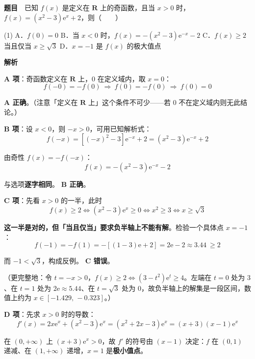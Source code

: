 \par\medskip


\textbf{题目}　已知 $f(x)$ 是定义在 $\mathbf{R}$ 上的奇函数，且当 $x>0$ 时，$f(x)=\left(x^2-3\right)\mathrm{e}^{x}+2$，则（　　）

\begin{gkopts}(1)
\task A．$f(0)=0$
\task B．当 $x<0$ 时，$f(x)=-\left(x^2-3\right)\mathrm{e}^{-x}-2$
\task C．$f(x)\ge 2$ 当且仅当 $x\ge\sqrt3$
\task D．$x=-1$ 是 $f(x)$ 的极大值点
\end{gkopts}

\textbf{解析}

\par\medskip

\textbf{A 项}：奇函数定义在 $\mathbf R$ 上，$0$ 在定义域内，取 $x=0$：
\[f(-0)=-f(0)\ \Longrightarrow\ f(0)=-f(0)\ \Longrightarrow\ f(0)=0\]

 \textbf{A 正确}。（注意「定义在 $\mathbf R$ 上」这个条件不可少——若 $0$ 不在定义域内则无此结论。）

\textbf{B 项}：设 $x<0$，则 $-x>0$，可用已知解析式：
\[f(-x)=\left[(-x)^2-3\right]\mathrm{e}^{-x}+2=\left(x^2-3\right)\mathrm{e}^{-x}+2\]

由奇性 $f(x)=-f(-x)$：
\[f(x)=-\left(x^2-3\right)\mathrm{e}^{-x}-2\]

与选项\textbf{逐字相同}。 \textbf{B 正确}。

\textbf{C 项}：先看 $x>0$ 的一半，此时
\[f(x)\ge2\iff\left(x^2-3\right)\mathrm{e}^{x}\ge0\iff x^2\ge3\iff x\ge\sqrt3\]

\textbf{这一半是对的，但「当且仅当」要求负半轴上不能有解}。检验一个具体点 $x=-1$：
\[f(-1)=-f(1)=-\left[\left(1-3\right)\mathrm{e}+2\right]=2\mathrm{e}-2\approx3.44\ \ge2\]

而 $-1<\sqrt3$，构成反例。 \textbf{C 错误}。

（更完整地：令 $t=-x>0$，$f(x)\ge2\iff\left(3-t^2\right)\mathrm{e}^{t}\ge4$。左端在 $t=0$ 处为 $3$、在 $t=1$ 处为 $2\mathrm{e}\approx5.44$、在 $t=\sqrt3$ 处为 $0$，故负半轴上的解集是一段区间，数值上约为 $x\in[-1.429,\,-0.323]$。）

\textbf{D 项}：先求 $x>0$ 时的导数：
\[f'(x)=2x\mathrm{e}^{x}+\left(x^2-3\right)\mathrm{e}^{x}=\left(x^2+2x-3\right)\mathrm{e}^{x}=(x+3)(x-1)\mathrm{e}^{x}\]

在 $(0,+\infty)$ 上 $(x+3)\mathrm{e}^x>0$，故 $f'$ 的符号由 $(x-1)$ 决定：$f$ 在 $(0,1)$ 递减、在 $(1,+\infty)$ 递增，$x=1$ 是\textbf{极小值点}。

